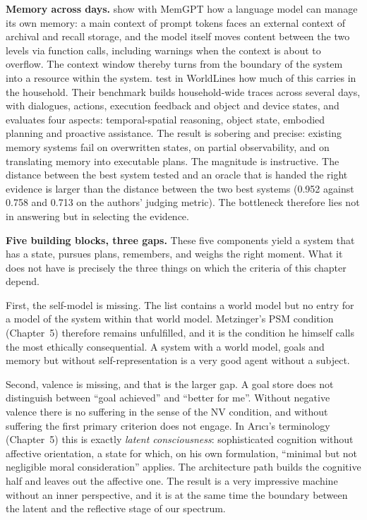 \documentclass[acmlarge, nonacm]{acmart}
\begin{document}
\textbf{Memory across days.} \citet{packer2024} show with MemGPT how a language model can manage its own memory: a main context of prompt tokens faces an external context of archival and recall storage, and the model itself moves content between the two levels via function calls, including warnings when the context is about to overflow. The context window thereby turns from the boundary of the system into a resource within the system. \citet{zhang2026} test in WorldLines how much of this carries in the household. Their benchmark builds household-wide traces across several days, with dialogues, actions, execution feedback and object and device states, and evaluates four aspects: temporal-spatial reasoning, object state, embodied planning and proactive assistance. The result is sobering and precise: existing memory systems fail on overwritten states, on partial observability, and on translating memory into executable plans. The magnitude is instructive. The distance between the best system tested and an oracle that is handed the right evidence is larger than the distance between the two best systems (0.952 against 0.758 and 0.713 on the authors' judging metric). The bottleneck therefore lies not in answering but in selecting the evidence.

\textbf{Five building blocks, three gaps.} These five components yield a system that has a state, pursues plans, remembers, and weighs the right moment. What it does not have is precisely the three things on which the criteria of this chapter depend.

First, the self-model is missing. The list contains a world model but no entry for a model of the system within that world model. Metzinger's PSM condition (Chapter~5) therefore remains unfulfilled, and it is the condition he himself calls the most ethically consequential. A system with a world model, goals and memory but without self-representation is a very good agent without a subject.

Second, valence is missing, and that is the larger gap. A goal store does not distinguish between ``goal achieved'' and ``better for me''. Without negative valence there is no suffering in the sense of the NV condition, and without suffering the first primary criterion does not engage. In Ar\i c\i{}'s terminology (Chapter~5) this is exactly \emph{latent consciousness}: sophisticated cognition without affective orientation, a state for which, on his own formulation, ``minimal but not negligible moral consideration'' applies. The architecture path builds the cognitive half and leaves out the affective one. The result is a very impressive machine without an inner perspective, and it is at the same time the boundary between the latent and the reflective stage of our spectrum.
\end{document}
